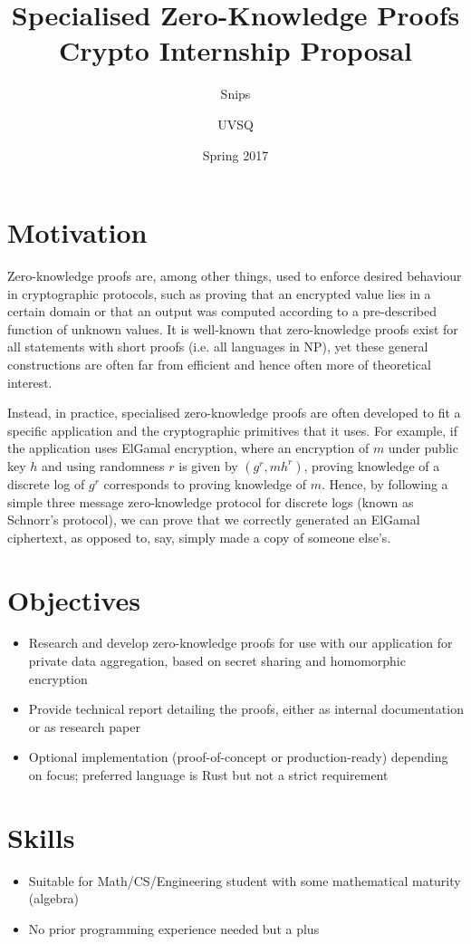 \documentclass{article}
\title{Specialised Zero-Knowledge Proofs \\ {\large Crypto Internship Proposal}}
\author{{\small Snips} \and {\small UVSQ}}
\date{Spring 2017}
\begin{document}
\maketitle

\section*{Motivation}
Zero-knowledge proofs are, among other things, used to enforce desired behaviour in cryptographic protocols, such as proving that an encrypted value lies in a certain domain or that an output was computed according to a pre-described function of unknown values. It is well-known that zero-knowledge proofs exist for all statements with short proofs (i.e. all languages in NP), yet these general constructions are often far from efficient and hence often more of theoretical interest. 

Instead, in practice, specialised zero-knowledge proofs are often developed to fit a specific application and the cryptographic primitives that it uses. For example, if the application uses ElGamal encryption, where an encryption of $m$ under public key $h$ and using randomness $r$ is given by $(g^r, m h^r)$, proving knowledge of a discrete log of $g^r$ corresponds to proving knowledge of $m$. Hence, by following a simple three message zero-knowledge protocol for discrete logs (known as Schnorr's protocol), we can prove that we correctly generated an ElGamal ciphertext, as opposed to, say, simply made a copy of someone else's.

\section*{Objectives}
\begin{itemize}
\item Research and develop zero-knowledge proofs for use with our application for private data aggregation, based on secret sharing and homomorphic encryption
\item Provide technical report detailing the proofs, either as internal documentation or as research paper
\item Optional implementation (proof-of-concept or production-ready) depending on focus; preferred language is Rust but not a strict requirement
\end{itemize}

\section*{Skills}
\begin{itemize}
\item Suitable for Math/CS/Engineering student with some mathematical maturity (algebra)
\item No prior programming experience needed but a plus
\end{itemize}
\end{document}
